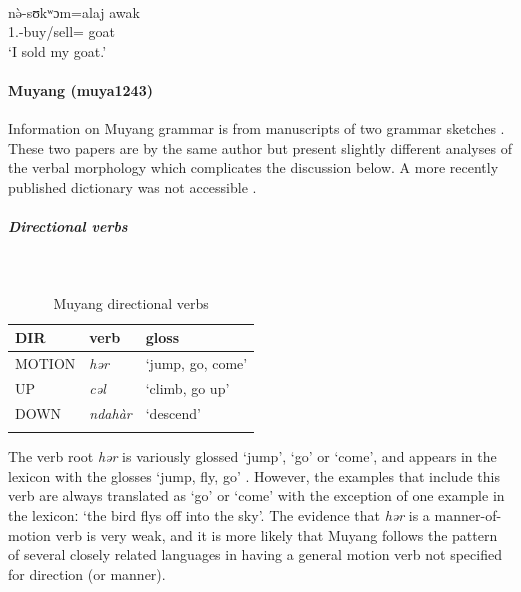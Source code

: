\ex\label{ex2:molo14}
 \\
\gll nə̀-sʊkʷɔm=alaj awak\\
1.-buy/sell= goat	\\
\glt `I sold my goat.'
\z

\paragraph*{Muyang (muya1243)} \label{muya}

Information on Muyang grammar is from manuscripts of two grammar sketches \citep{smithMuyangVerbPhrase2002,smithDefinitenessTopicalisationTheme2003}. These two papers are by the same author but present slightly different analyses of the verbal morphology which complicates the discussion below. A more recently published dictionary was not accessible \citep{smithDictionnaireMuyangfrancaisanglaisAvec2017}.

\subparagraph{Directional verbs}~

\begin{table}[H]
	\caption{Muyang directional verbs} 
	\label{tab:muyaV}
	\begin{tabular}{lll} %
		\lsptoprule
		DIR & verb & gloss   \\ %
		\midrule
		MOTION & \textit{hər} & `jump, go, come' \\
		UP & \textit{cəl} & `climb, go up' \\
		DOWN & \textit{ndahàr} & `descend' \\
		\lspbottomrule
	\end{tabular}
\end{table}

The verb root \textit{hər} is variously glossed `jump', `go' or `come', and appears in the lexicon with the glosses `jump, fly, go' \citep[38]{smithMuyangProvisionalLexicon2003}. However, the examples that include this verb are always translated as `go' or `come' with the exception of one example in the lexiconː `the bird flys off into the sky'. The evidence that \textit{hər} is a manner-of-motion verb is very weak, and it is more likely that Muyang follows the pattern of several closely related languages in having a general motion verb not specified for direction (or manner). 


